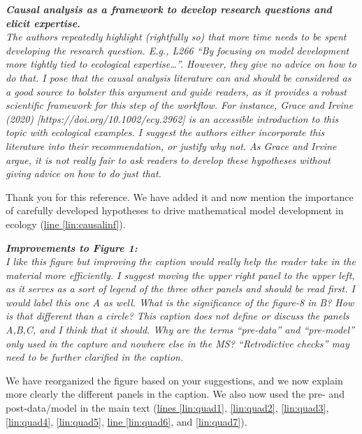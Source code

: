 \documentclass[11pt,letter]{article}
\begin{document}
\begin{mybox}
\emph{\textbf{Causal analysis as a framework to develop research questions and elicit expertise.}\\
The authors repeatedly highlight (rightfully so) that more time needs to be spent developing the research question. E.g., L266 “By focusing on model development more tightly tied to ecological expertise…”. However, they give no advice on how to do that. I pose that the causal analysis literature can and should be considered as a good source to bolster this argument and guide readers, as it provides a robust scientific framework for this step of the workflow. For instance, Grace and Irvine (2020) [https://doi.org/10.1002/ecy.2962] is an accessible introduction to this topic with ecological examples. I suggest the authors either incorporate this literature into their recommendation, or justify why not. As Grace and Irvine argue, it is not really fair to ask readers to develop these hypotheses without giving advice on how to do just that.}
\end{mybox}

Thank you for this reference. We have added it and now mention the importance of carefully developed hypotheses to drive mathematical model development in ecology (\href{file:forecastflows_r1\#lintarget:causalinf}{line \ref*{lin:causalinf}}).

\begin{mybox}
\emph{\textbf{Improvements to Figure 1:}\\
I like this figure but improving the caption would really help the reader take in the material more efficiently. I suggest moving the upper right panel to the upper left, as it serves as a sort of legend of the three other panels and should be read first. I would label this one A as well. What is the significance of the figure-8 in B? How is that different than a circle? This caption does not define or discuss the panels A,B,C, and I think that it should. Why are the terms “pre-data” and “pre-model” only used in the capture and nowhere else in the MS? “Retrodictive checks” may need to be further clarified in the caption.}
\end{mybox}

We have reorganized the figure based on your suggestions, and we now explain more clearly the different panels in the caption.
We also now used the pre- and post-data/model in the main text (\href{file:forecastflows_r1\#lintarget:quad1}{lines \ref*{lin:quad1}}, \href{file:forecastflows_r1\#lintarget:quad2}{\ref*{lin:quad2}}, \href{file:forecastflows_r1\#lintarget:quad3}{\ref*{lin:quad3}}, \href{file:forecastflows_r1\#lintarget:quad4}{\ref*{lin:quad4}}, \href{file:forecastflows_r1\#lintarget:quad5}{\ref*{lin:quad5}}, \href{file:forecastflows_r1\#lintarget:quad6}{line \ref*{lin:quad6}}, and \href{file:forecastflows_r1\#lintarget:quad7}{\ref*{lin:quad7}}).
\end{document}

